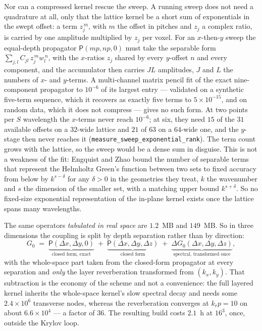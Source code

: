 \documentclass[11pt,a4paper]{article}
\newcommand{\Gz}{G_0}
\begin{document}
Nor can a compressed kernel rescue the sweep. A running sweep does not need a quadrature at
all, only that the lattice kernel be a short sum of exponentials in the swept offset: a term
$z_j^{\,m}$, with $m$ the offset in pitches and $z_j$ a complex ratio, is carried by one amplitude
multiplied by $z_j$ per voxel. For an $x$-then-$y$ sweep the equal-depth propagator
$\mathsf{P}(m p, n p, 0)$ must take the separable form
$\sum_{j,l} C_{jl}\, z_j^{\,m} w_l^{\,n}$, with the $x$-ratios $z_j$ shared by every $y$-offset
$n$ and every component, and the accumulator then carries $J L$ amplitudes, $J$ and $L$ the
numbers of $x$- and $y$-terms. A multi-channel matrix pencil fit of the exact nine-component
propagator to $10^{-6}$ of its largest entry --- validated on a synthetic five-term sequence,
which it recovers as exactly five terms to $5\times10^{-15}$, and on random data, which it does
not compress --- gives no such form. At two points per $S$ wavelength the $x$-terms never reach
$10^{-6}$; at six, they need $15$ of the $31$ available offsets on a $32$-wide lattice and $21$ of
$63$ on a $64$-wide one, and the $y$-stage then never reaches it
(\texttt{measure\_sweep\_exponential\_rank}). The term count grows with the lattice, so the sweep
would be a dense sum in disguise. This is not a weakness of the fit: Engquist and
Zhao \cite{EngquistZhao} bound the number of separable terms that represent the Helmholtz
Green's function between two sets to fixed accuracy from below by $k^{s-\delta}$ for any
$\delta > 0$ in the geometries they treat, $k$ the wavenumber and $s$ the dimension of the
smaller set, with a matching upper bound $k^{s+\delta}$. So no fixed-size exponential
representation of the in-plane kernel exists once the lattice spans many wavelengths.

The same operators \emph{tabulated in real space} are $1.2$~MB and $149$~MB. So in three
dimensions the coupling is split by depth separation rather than by direction:
\begin{equation}
\Gz \;=\;
\underbrace{\mathsf{P}(\Delta x, \Delta y, 0)}_{\text{closed form, exact}}
\;+\;
\underbrace{\mathsf{P}(\Delta x, \Delta y, \Delta z)}_{\text{closed form}}
\;+\;
\underbrace{\Delta\Gz(\Delta x, \Delta y, \Delta z)}_{\text{spectral, transformed once}} ,
\label{eq:threedsplit}
\end{equation}
with the whole-space part taken from the closed-form propagator at every separation and
\emph{only} the layer reverberation transformed from $(k_x,k_y)$. That subtraction is the
economy of the scheme and not a convenience: the full layered kernel inherits the whole-space
kernel's slow spectral decay and needs some $2.4\times10^6$ transverse nodes, whereas the
reverberation converges at $k_r p = 10$ on about $6.6\times10^4$ --- a factor of 36. The
resulting build costs $2.1$~h at $16^3$, once, outside the Krylov loop.
\end{document}
